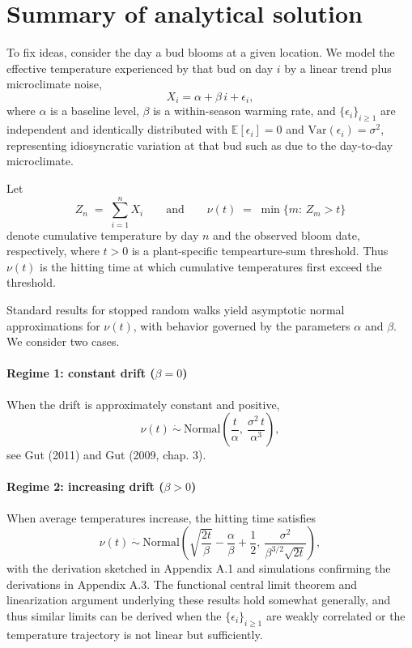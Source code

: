 \section{Summary of analytical solution}\label{mathystuff}

To fix ideas, consider the day a bud blooms at a given location. We
model the effective temperature experienced by that bud on day \(i\) by
a linear trend plus microclimate noise, \begin{equation}
X_i = \alpha + \beta\, i + \epsilon_i,
\end{equation} where \(\alpha\) is a baseline level, \(\beta\) is a
within-season warming rate, and \(\{\epsilon_i\}_{i\ge 1}\) are
independent and identically distributed with
\(\mathbb{E}[\epsilon_i]=0\) and \(\mathrm{Var}(\epsilon_i)=\sigma^2\),
representing idiosyncratic variation at that bud such as due to the
day-to-day microclimate.

Let \begin{equation}
Z_n \;=\; \sum_{i=1}^n X_i
\qquad\text{and}\qquad
\nu(t) \;=\; \min\{m:\, Z_m>t\}
\end{equation} denote cumulative temperature by day \(n\) and the
observed bloom date, respectively, where \(t>0\) is a plant-specific
tempearture-sum threshold. Thus \(\nu(t)\) is the hitting time at which
cumulative temperatures first exceed the threshold.

Standard results for stopped random walks yield asymptotic normal
approximations for \(\nu(t)\), with behavior governed by the parameters
\(\alpha\) and \(\beta\). We consider two cases.

\paragraph{Regime 1: constant drift ($\beta=0$)}

When the drift is approximately constant and positive, \begin{equation}
\nu(t)\ \dot{\sim}\ \mathrm{Normal}\!\left(\frac{t}{\alpha},\ \frac{\sigma^2\,t}{\alpha^{3}}\right),
\label{eq:nu_beta0}
\end{equation} see Gut (2011) and Gut (2009, chap. 3).

\paragraph{Regime 2: increasing drift ($\beta>0$)}

When average temperatures increase, the hitting time satisfies
\begin{equation}
\nu(t)\ \dot{\sim}\ \mathrm{Normal}\!\left(\sqrt{\frac{2t}{\beta}} - \frac{\alpha}{\beta} + \frac{1}{2},\ \frac{\sigma^2}{\beta^{3/2}\sqrt{2t}}\right),
\label{eq:nu_beta_pos}
\end{equation} with the derivation sketched in Appendix A.1 and
simulations confirming the derivations in Appendix A.3. The functional
central limit theorem and linearization argument underlying these
results hold somewhat generally, and thus similar limits can be derived
when the \(\{\epsilon_i\}_{i\ge 1}\) are weakly correlated or the
temperature trajectory is not linear but sufficiently.

